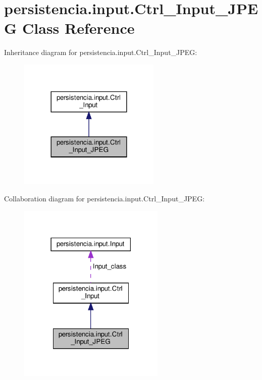 \hypertarget{classpersistencia_1_1input_1_1Ctrl__Input__JPEG}{}\section{persistencia.\+input.\+Ctrl\+\_\+\+Input\+\_\+\+J\+P\+EG Class Reference}
\label{classpersistencia_1_1input_1_1Ctrl__Input__JPEG}


Inheritance diagram for persistencia.\+input.\+Ctrl\+\_\+\+Input\+\_\+\+J\+P\+EG\+:\nopagebreak
\begin{figure}[H]
\begin{center}
\leavevmode
\includegraphics[width=192pt]{classpersistencia_1_1input_1_1Ctrl__Input__JPEG__inherit__graph}
\end{center}
\end{figure}


Collaboration diagram for persistencia.\+input.\+Ctrl\+\_\+\+Input\+\_\+\+J\+P\+EG\+:\nopagebreak
\begin{figure}[H]
\begin{center}
\leavevmode
\includegraphics[width=198pt]{classpersistencia_1_1input_1_1Ctrl__Input__JPEG__coll__graph}
\end{center}
\end{figure}
